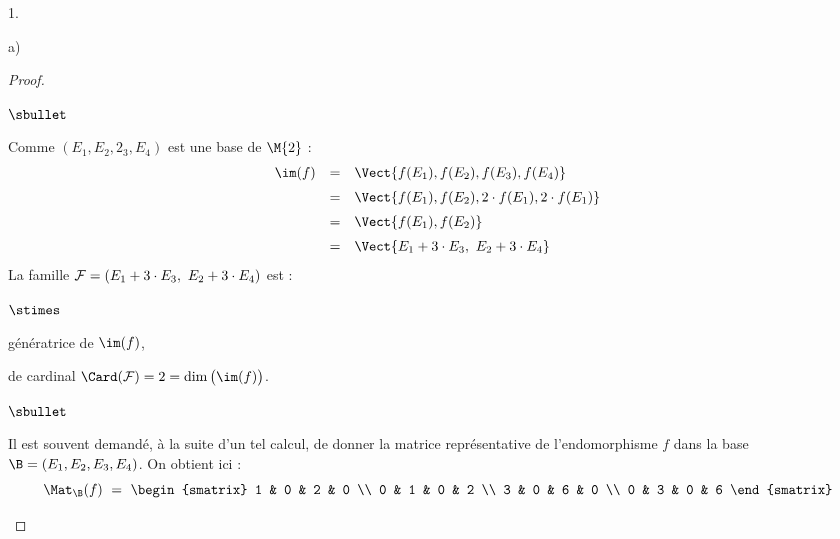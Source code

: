 \documentclass[11pt]{article}%
\begin{document}
\begin{noliste}{1.}
\begin{noliste}{a)}
\begin{proof}
\begin{noliste}{$\sbullet$}
      \item Comme $(E_1, E_2, 2_3, E_4)$ est une base de $\M{2}$ :
        \[
        \begin{array}{rcl}
          \im(f) & = & \Vect{f(E_1), f(E_2), f(E_3), f(E_4)}
          \\[.2cm]
          & = & \Vect{f(E_1), f(E_2), 2 \cdot f(E_1), 2 \cdot f(E_1)}
          \\[.2cm]
          & = & \Vect{f(E_1), f(E_2)}
          \\[.2cm]
          & = & \Vect{E_1 + 3 \cdot E_3, \ E_2 + 3 \cdot E_4}
        \end{array}
        \]
        La famille ${\cal F} = (E_1 + 3 \cdot E_3, \ E_2 + 3 \cdot
        E_4)$ est :
        \begin{noliste}{$\stimes$}
        \item génératrice de $\im(f)$,
        \item de cardinal $\Card({\cal F}) = 2 = \dim\big( \im(f)
          \big)$.
        \end{noliste}
      \end{noliste}
      \begin{remark}%
        \begin{noliste}{$\sbullet$}
        \item Il est souvent demandé, à la suite d'un tel calcul, de
          donner la matrice représentative de l'endomorphisme $f$ dans
          la base $\B = (E_1, E_2, E_3, E_4)$. On obtient ici :
          \[
          \Mat_{\B}(f) \ = \
          \begin{smatrix}
            1 & 0 & 2 & 0 \\
            0 & 1 & 0 & 2 \\
            3 & 0 & 6 & 0 \\
            0 & 3 & 0 & 6
          \end{smatrix}
          \]


\end{noliste}
\end{remark}
\end{proof}
\end{noliste}
\end{noliste}
\end{document}
